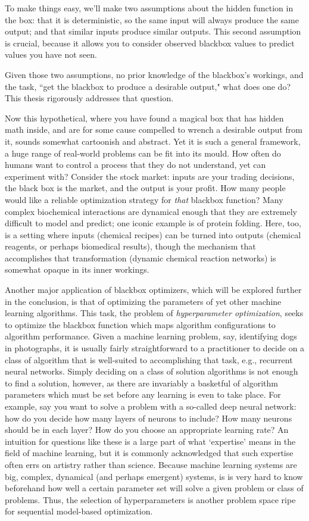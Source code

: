 To make things easy, we'll make two assumptions about the hidden function in the box: that it is deterministic, so the same input will always produce the same output; and that similar inputs produce similar outputs. This second assumption is crucial, because it allows you to consider observed blackbox values to predict values you have not seen.

Given those two assumptions, no prior knowledge of the blackbox's workings, and the task, ``get the blackbox to produce a desirable output," what does one do? This thesis rigorously addresses that question.

Now this hypothetical, where you have found a magical box that has hidden math inside, and are for some cause compelled to wrench a desirable output from it, sounds somewhat cartoonish and abstract. Yet it is such a general framework, a huge range of real-world problems can be fit into its mould. How often do humans want to control a process that they do not understand, yet can experiment with? Consider the stock market: inputs are your trading decisions, the black box is the market, and the output is your profit. How many people would like a reliable optimization strategy for \emph{that} blackbox function? Many complex biochemical interactions are dynamical enough that they are extremely difficult to model and predict; one iconic example is of protein folding. Here, too, is a setting where inputs (chemical recipes) can be turned into outputs (chemical reagents, or perhaps biomedical results), though the mechanism that accomplishes that transformation (dynamic chemical reaction networks) is somewhat opaque in its inner workings. 

Another major application of blackbox optimizers, which will be explored further in the conclusion, is that of optimizing the parameters of yet other machine learning algorithms. This task, the problem of \emph{hyperparameter optimization}, seeks to optimize the blackbox function which maps algorithm configurations to algorithm performance. Given a machine learning problem, say, identifying dogs in photographs, it is usually fairly straightforward to a practitioner to decide on a class of algorithm that is well-suited to accomplishing that task, e.g., recurrent neural networks. Simply deciding on a class of solution algorithms is not enough to find a solution, however, as there are invariably a basketful of algorithm parameters which must be set before any learning is even to take place. For example, say you want to solve a problem with a so-called deep neural network: how do you decide how many layers of neurons to include? How many neurons should be in each layer? How do you choose an appropriate learning rate? An intuition for questions like these is a large part of what `expertise' means in the field of machine learning, but it is commonly acknowledged that such expertise often errs on artistry rather than science. Because machine learning systems are big, complex, dynamical (and perhaps emergent) systems, is is very hard to know beforehand how well a certain parameter set will solve a given problem or class of problems. Thus, the selection of hyperparameters is another problem space ripe for sequential model-based optimization.

